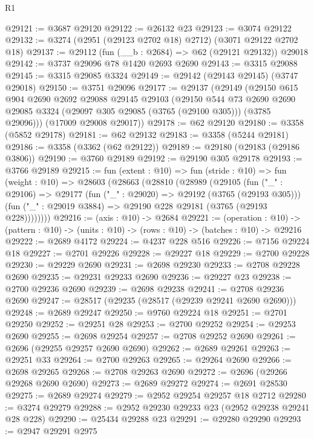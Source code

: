 \begin{lexlean}{R1}
\begin{coremodule}
@29121 := @3687 @29120
@29122 := @26132 @23
@29123 := @3074 @29122
@29132 := @3274 (@2951 (@29123 @2702 @18) @2712) (@3071 @29122 @2702 @18)
@29137 := @29112 (fun (__b : @2684) => @62 (@29121 @29132)) @29018
@29142 := @3737 @29096 @78 @1420 @2693 @2690
@29143 := @3315 @29088
@29145 := @3315 @29085 @3324
@29149 := @29142 (@29143 @29145) (@3747 @29018)
@29150 := @3751 @29096
@29177 := @29137
    (@29149
      (@29150
        @615
        @904
        @2690
        @2692
        @29088
        @29145
        @29103
        (@29150
          @544
          @73
          @2690
          @2690
          @29085
          @3324
          (@29097 @305 @29085 (@3765 (@29100 @305)))
          (@3785 @29096)))
      (@17009 @29008 @29017))
@29178 := @62 @29120
@29180 := @3358 (@5852 @29178)
@29181 := @62 @29132
@29183 := @3358 (@5244 @29181)
@29186 := @3358 (@3362 (@62 @29122))
@29189 := @29180 (@29183 (@29186 @3806))
@29190 := @3760 @29189
@29192 := @29190 @305 @29178
@29193 := @3766 @29189
@29215 := fun (extent : @10) =>
  fun (stride : @10) =>
  fun (weight : @10) =>
  @28603
    (@28663
      (@28810
        (@28989
          (@29105
            (fun ("_" : @29106) =>
            @29177
              (fun ("_" : @29020) => @29192 (@3765 (@29193 @305)))
              (fun ("_" : @29019 @3884) => @29190 @228 @29181 (@3765 (@29193 @228))))))))
@29216 := (axis : @10) -> @2684
@29221 := (operation : @10) ->
  (pattern : @10) -> (units : @10) -> (rows : @10) -> (batches : @10) -> @29216
@29222 := @2689 @4172
@29224 := @4237 @228 @516
@29226 := @7156 @29224 @18
@29227 := @2701 @29226
@29228 := @29227 @18
@29229 := @2700 @29228
@29230 := @29229 @2690
@29231 := @2698 @29230
@29233 := @2708 @29228 @2690
@29235 := @29231 @29233 @2690
@29236 := @29227 @23
@29238 := @2700 @29236 @2690
@29239 := @2698 @29238
@29241 := @2708 @29236 @2690
@29247 := @28517 (@29235 (@28517 (@29239 @29241 @2690 @2690)))
@29248 := @2689 @29247
@29250 := @9760 @29224 @18
@29251 := @2701 @29250
@29252 := @29251 @28
@29253 := @2700 @29252
@29254 := @29253 @2690
@29255 := @2698 @29254
@29257 := @2708 @29252 @2690
@29261 := @2696 (@29255 @29257 @2690 @2690)
@29262 := @2689 @29261
@29263 := @29251 @33
@29264 := @2700 @29263
@29265 := @29264 @2690
@29266 := @2698 @29265
@29268 := @2708 @29263 @2690
@29272 := @2696 (@29266 @29268 @2690 @2690)
@29273 := @2689 @29272
@29274 := @2691 @28530
@29275 := @2689 @29274
@29279 := @2952 @29254 @29257 @18 @2712
@29280 := @3274 @29279
@29288 := @2952 @29230 @29233 @23 (@2952 @29238 @29241 @28 @228)
@29290 := @25434 @29288 @23
@29291 := @29280 @29290
@29293 := @2947 @29291 @2975

\end{coremodule}
\end{lexlean}

